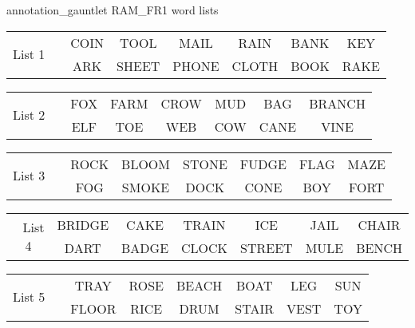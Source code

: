 \documentclass{article}
\begin{document}
\begin{center}
{\large annotation\_gauntlet RAM\_FR1 word lists}
\end{center}

\vspace{.1in}
\hspace{.5in}\begin{tabular}{r||c c c c c c }
\multirow{2}{*}{List 1~~} & COIN & TOOL & MAIL & RAIN & BANK & KEY\\
\cline{2-7}			& ARK & SHEET & PHONE & CLOTH & BOOK & RAKE\\
\end{tabular}

\vspace{.1in}
\hspace{.5in}\begin{tabular}{r||c c c c c c }
\multirow{2}{*}{List 2~~} & FOX & FARM & CROW & MUD & BAG & BRANCH\\
\cline{2-7}			& ELF & TOE & WEB & COW & CANE & VINE\\
\end{tabular}

\vspace{.1in}
\hspace{.5in}\begin{tabular}{r||c c c c c c }
\multirow{2}{*}{List 3~~} & ROCK & BLOOM & STONE & FUDGE & FLAG & MAZE\\
\cline{2-7}			& FOG & SMOKE & DOCK & CONE & BOY & FORT\\
\end{tabular}

\vspace{.1in}
\hspace{.5in}\begin{tabular}{r||c c c c c c }
\multirow{2}{*}{List 4~~} & BRIDGE & CAKE & TRAIN & ICE & JAIL & CHAIR\\
\cline{2-7}			& DART & BADGE & CLOCK & STREET & MULE & BENCH\\
\end{tabular}

\vspace{.1in}
\hspace{.5in}\begin{tabular}{r||c c c c c c }
\multirow{2}{*}{List 5~~} & TRAY & ROSE & BEACH & BOAT & LEG & SUN\\
\cline{2-7}			& FLOOR & RICE & DRUM & STAIR & VEST & TOY\\
\end{tabular}
\end{document}
